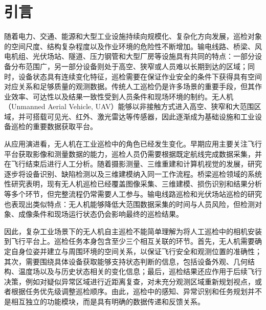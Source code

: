 

\section{引言}

随着电力、交通、能源和大型工业设施持续向规模化、复杂化方向发展，巡检对象的空间尺度、结构复杂程度以及作业环境的危险性不断增加。输电线路、桥梁、风电机组、光伏场站、隧道、压力钢管和大型厂房等设施具有共同的特点：一部分设备分布范围广，另一部分设备则处于高空、狭窄或人员难以长期到达的区域；同时，设备状态具有连续变化特征，巡检需要在保证作业安全的条件下获得具有空间对应关系和足够质量的观测数据。传统人工巡检仍是许多场景的重要手段，但其作业效率、可达性以及结果一致性受到人员条件和现场环境的制约。无人机（Unmanned Aerial Vehicle, UAV）能够以非接触方式进入高空、狭窄和大范围区域，并可搭载可见光、红外、激光雷达等传感器，因此逐渐成为基础设施和工业设备巡检的重要数据获取平台\cite{Nguyen2018PowerLine,Ahmed2020BridgeNDE,Zhang2022UBI,Panigati2025Bridge,Yahya2022PVReview,Shakhatreh2019UAV,nooralishahi2021drones,safie2025trip,nooralishahi2022access}。

从应用演进看，无人机在工业巡检中的角色已经发生变化。早期应用主要关注飞行平台获取影像和测量数据的能力，巡检人员仍需要根据既定航线完成数据采集，并在飞行结束后进行人工分析。随着摄影测量、三维重建和计算机视觉的发展，研究逐步将设备识别、缺陷检测以及三维建模纳入同一工作流程\cite{Colomina2014UAV,Nex2014UAV,Jeong2020BridgeReview,Lin2021BridgeAerialRobots}。桥梁巡检领域的系统性研究表明，现有无人机巡检已经覆盖图像采集、三维建模、损伤识别和结果分析等多个环节，但完整流程仍常需要人工参与\cite{Zhang2022UBI,Lin2021BridgeAerialRobots}。输电线路巡检和光伏场站巡检的研究也表现出类似特点：无人机能够降低大范围数据采集的时间与人员风险，但检测对象、成像条件和现场运行状态仍会影响最终的巡检结果\cite{Nguyen2018PowerLine,Ahmed2024Transmission,Yahya2022PVReview,Ramirez2022PVRTK}。

因此，复杂工业场景下的无人机自主巡检不能简单理解为将人工巡检中的相机安装到飞行平台上。巡检任务本身包含至少三个相互关联的环节。首先，无人机需要确定自身位姿并建立与周围环境的空间关系，以保证飞行安全和观测位置的准确性；其次，需要围绕具体设备获取能够支持状态判断的信息，包括设备外观、几何结构、温度场以及与历史状态相关的变化信息；最后，巡检结果还应作用于后续飞行决策，例如对疑似异常区域进行近距离复查，对未充分观测区域重新规划视点，或者根据任务优先级调整巡检顺序。由此，巡检中的感知、异常识别和任务规划并不是相互独立的功能模块，而是具有明确的数据传递和反馈关系\cite{Zhang2022UBI,Alqudsi2026GNSSDenied}。

